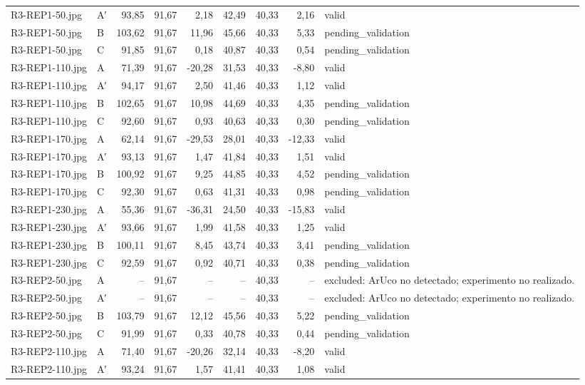 \begin{scriptsize}
\begin{longtable}{@{}llrrrrrrl@{}}
R3-REP1-50.jpg & A′ & 93,85 & 91,67 & 2,18 & 42,49 & 40,33 & 2,16 & valid \\
R3-REP1-50.jpg & B & 103,62 & 91,67 & 11,96 & 45,66 & 40,33 & 5,33 & pending\_validation \\
R3-REP1-50.jpg & C & 91,85 & 91,67 & 0,18 & 40,87 & 40,33 & 0,54 & pending\_validation \\
R3-REP1-110.jpg & A & 71,39 & 91,67 & -20,28 & 31,53 & 40,33 & -8,80 & valid \\
R3-REP1-110.jpg & A′ & 94,17 & 91,67 & 2,50 & 41,46 & 40,33 & 1,12 & valid \\
R3-REP1-110.jpg & B & 102,65 & 91,67 & 10,98 & 44,69 & 40,33 & 4,35 & pending\_validation \\
R3-REP1-110.jpg & C & 92,60 & 91,67 & 0,93 & 40,63 & 40,33 & 0,30 & pending\_validation \\
R3-REP1-170.jpg & A & 62,14 & 91,67 & -29,53 & 28,01 & 40,33 & -12,33 & valid \\
R3-REP1-170.jpg & A′ & 93,13 & 91,67 & 1,47 & 41,84 & 40,33 & 1,51 & valid \\
R3-REP1-170.jpg & B & 100,92 & 91,67 & 9,25 & 44,85 & 40,33 & 4,52 & pending\_validation \\
R3-REP1-170.jpg & C & 92,30 & 91,67 & 0,63 & 41,31 & 40,33 & 0,98 & pending\_validation \\
R3-REP1-230.jpg & A & 55,36 & 91,67 & -36,31 & 24,50 & 40,33 & -15,83 & valid \\
R3-REP1-230.jpg & A′ & 93,66 & 91,67 & 1,99 & 41,58 & 40,33 & 1,25 & valid \\
R3-REP1-230.jpg & B & 100,11 & 91,67 & 8,45 & 43,74 & 40,33 & 3,41 & pending\_validation \\
R3-REP1-230.jpg & C & 92,59 & 91,67 & 0,92 & 40,71 & 40,33 & 0,38 & pending\_validation \\
R3-REP2-50.jpg & A & -- & 91,67 & -- & -- & 40,33 & -- & excluded: ArUco no detectado; experimento no realizado. \\
R3-REP2-50.jpg & A′ & -- & 91,67 & -- & -- & 40,33 & -- & excluded: ArUco no detectado; experimento no realizado. \\
R3-REP2-50.jpg & B & 103,79 & 91,67 & 12,12 & 45,56 & 40,33 & 5,22 & pending\_validation \\
R3-REP2-50.jpg & C & 91,99 & 91,67 & 0,33 & 40,78 & 40,33 & 0,44 & pending\_validation \\
R3-REP2-110.jpg & A & 71,40 & 91,67 & -20,26 & 32,14 & 40,33 & -8,20 & valid \\
R3-REP2-110.jpg & A′ & 93,24 & 91,67 & 1,57 & 41,41 & 40,33 & 1,08 & valid \\

\end{longtable}
\end{scriptsize}

